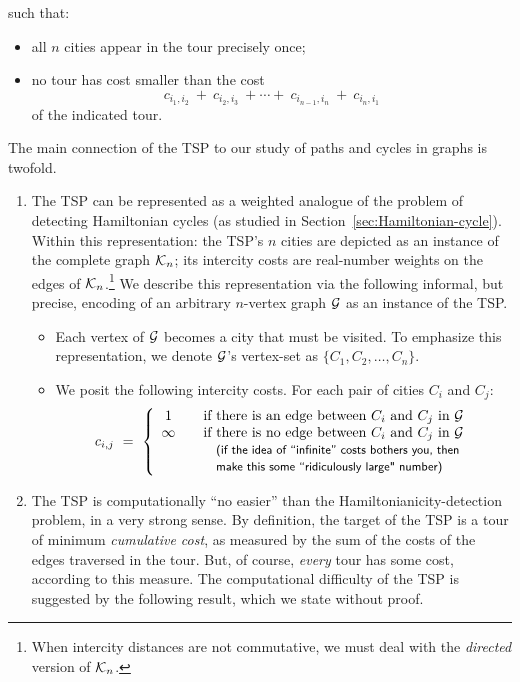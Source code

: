 \noindent such that:
\begin{itemize}
\item
all $n$ cities appear in the tour precisely once;
\item
no tour has cost smaller than the cost
\[ c_{i_1,i_2} \ + \ c_{i_2, i_3} \ + \cdots + \ c_{i_{n-1}, i_n} \ + \ c_{i_n, i_1}
\]
of the indicated tour.
\end{itemize}
The main connection of the TSP to our study of paths and cycles in graphs is twofold.
\begin{enumerate}
\item
The TSP can be represented as a weighted analogue of the problem of detecting Hamiltonian cycles (as studied in Section~\ref{sec:Hamiltonian-cycle}).  Within this representation: the TSP's $n$ cities are depicted as an instance of the complete graph $\mbox{$\cal K$}_n$; its intercity costs are real-number weights on the edges of $\mbox{$\cal K$}_n$.\footnote{When intercity distances are not commutative, we must deal with the {\em directed} version of $\mbox{$\cal K$}_n$.}  We describe this representation via the following informal, but precise, encoding of an arbitrary $n$-vertex graph $\mbox{$\cal G$}$ as an instance of the TSP.
  \begin{itemize}
  \item
Each vertex of $\mbox{$\cal G$}$ becomes a city that must be visited.  To emphasize this representation, we denote $\mbox{$\cal G$}$'s vertex-set as $\{C_1, C_2, \ldots, C_n\}$.
  \item
We posit the following intercity costs.  For each pair of cities $C_i$ and $C_j$:
\[ c_{i,j} \ = \ \left\{
\begin{array}{ccl}
1 & & \mbox{if there is an edge between $C_i$ and $C_j$ in $\g$} \\
\infty & & \mbox{if there is no edge between $C_i$ and $C_j$ in $\g$} \\
       & & \mbox{\small\sf (if the idea of ``infinite'' costs bothers you, then} \\
       & & \mbox{\small\sf make this some ``ridiculously large" number)}
\end{array}
\right.
\]
\end{itemize}

\item
The TSP is computationally ``no easier'' than the Hamiltonianicity-detection problem, in a very strong sense.  By definition, the target of the TSP is a tour of minimum {\em cumulative cost}, as measured by the sum of the costs of the edges traversed in the tour.  But, of course, {\em every} tour has some cost, according to this measure.  The computational difficulty of the TSP is suggested by the following result, which we state without proof.
\end{enumerate}

